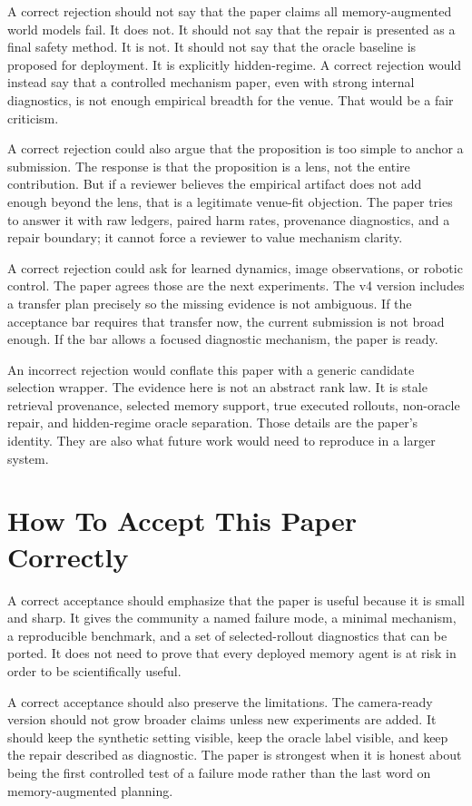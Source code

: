 \documentclass{article}
\begin{document}
A correct rejection should not say that the paper claims all memory-augmented
world models fail. It does not. It should not say that the repair is presented
as a final safety method. It is not. It should not say that the oracle baseline
is proposed for deployment. It is explicitly hidden-regime. A correct
rejection would instead say that a controlled mechanism paper, even with
strong internal diagnostics, is not enough empirical breadth for the venue.
That would be a fair criticism.

A correct rejection could also argue that the proposition is too simple to
anchor a submission. The response is that the proposition is a lens, not the
entire contribution. But if a reviewer believes the empirical artifact does
not add enough beyond the lens, that is a legitimate venue-fit objection. The
paper tries to answer it with raw ledgers, paired harm rates, provenance
diagnostics, and a repair boundary; it cannot force a reviewer to value
mechanism clarity.

A correct rejection could ask for learned dynamics, image observations, or
robotic control. The paper agrees those are the next experiments. The v4
version includes a transfer plan precisely so the missing evidence is not
ambiguous. If the acceptance bar requires that transfer now, the current
submission is not broad enough. If the bar allows a focused diagnostic
mechanism, the paper is ready.

An incorrect rejection would conflate this paper with a generic candidate
selection wrapper. The evidence here is not an abstract rank law. It is stale
retrieval provenance, selected memory support, true executed rollouts,
non-oracle repair, and hidden-regime oracle separation. Those details are the
paper's identity. They are also what future work would need to reproduce in a
larger system.

\section{How To Accept This Paper Correctly}
\label{app:correct-acceptance}

A correct acceptance should emphasize that the paper is useful because it is
small and sharp. It gives the community a named failure mode, a minimal
mechanism, a reproducible benchmark, and a set of selected-rollout diagnostics
that can be ported. It does not need to prove that every deployed memory agent
is at risk in order to be scientifically useful.

A correct acceptance should also preserve the limitations. The camera-ready
version should not grow broader claims unless new experiments are added. It
should keep the synthetic setting visible, keep the oracle label visible, and
keep the repair described as diagnostic. The paper is strongest when it is
honest about being the first controlled test of a failure mode rather than the
last word on memory-augmented planning.
\end{document}
